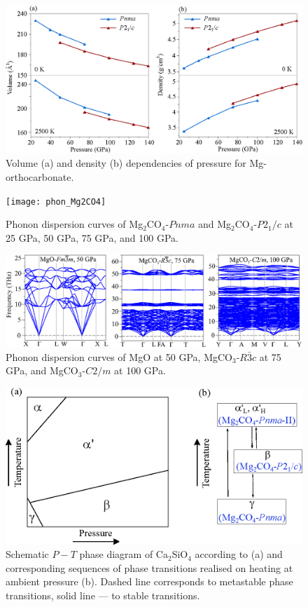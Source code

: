 \documentclass[a4paperm]{article}
\begin{document}
\begin{figure}[H]
	\includegraphics[width=\textwidth]{pv} \centering
	\caption{Volume (a) and density (b) dependencies of pressure for Mg-orthocarbonate.} \label{V-P}
\end{figure}

\begin{figure}[H]
	\texttt{[image: phon\_Mg2CO4]} \centering
	\caption{Phonon dispersion curves of Mg$_2$CO$_4$-$Pnma$ and Mg$_2$CO$_4$-$P2_1/c$ at 25 GPa, 50 GPa, 75 GPa, and 100 GPa.} \label{phon_mg2co4_supp}
\end{figure}

\begin{figure}[H]
	\includegraphics[width=\textwidth]{phon_MgCO3} \centering
	\caption{Phonon dispersion curves of MgO at 50 GPa, MgCO$_3$-$R\bar{3}c$ at 75 GPa, and MgCO$_3$-$C2/m$ at 100 GPa.} \label{phon_mgco3}
\end{figure}

\begin{figure}[H]
	\includegraphics[width=\textwidth]{pt_scheme} \centering
	\caption{Schematic $P-T$ phase diagram of Ca$_2$SiO$_4$  according to \cite{belmonte2017} (a) and corresponding sequences of phase transitions realised on heating at ambient pressure (b). Dashed line corresponds to metastable phase transitions, solid line --- to stable transitions.} \label{ca2sio4_pt}
\end{figure}
\end{document}
